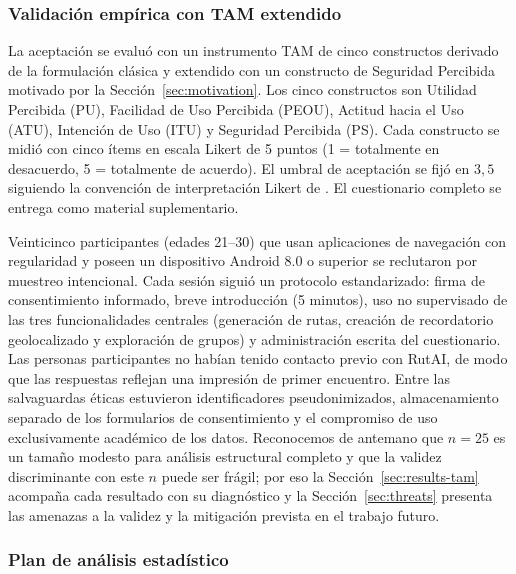 \documentclass[a4paper,fleqn]{cas-sc}
\newcommand{\RUTAI}{RutAI\xspace}
\newcommand{\TAM}{TAM\xspace}
\begin{document}
	\subsubsection{Validaci\'on emp\'irica con TAM extendido}\label{sec:tam-method}
	
	La aceptaci\'on se evalu\'o con un instrumento \TAM de cinco constructos derivado de la formulaci\'on cl\'asica \citep{davis1989tam} y extendido con un constructo de Seguridad Percibida motivado por la Secci\'on~\ref{sec:motivation}. Los cinco constructos son Utilidad Percibida (PU), Facilidad de Uso Percibida (PEOU), Actitud hacia el Uso (ATU), Intenci\'on de Uso (ITU) y Seguridad Percibida (PS). Cada constructo se midi\'o con cinco \'items en escala Likert de 5 puntos (1 = totalmente en desacuerdo, 5 = totalmente de acuerdo). El umbral de aceptaci\'on se fij\'o en $3{,}5$ siguiendo la convenci\'on de interpretaci\'on Likert de \citet{lindner2024likert}. El cuestionario completo se entrega como material suplementario.
	
	Veinticinco participantes (edades 21--30) que usan aplicaciones de navegaci\'on con regularidad y poseen un dispositivo Android 8.0 o superior se reclutaron por muestreo intencional. Cada sesi\'on sigui\'o un protocolo estandarizado: firma de consentimiento informado, breve introducci\'on (5 minutos), uso no supervisado de las tres funcionalidades centrales (generaci\'on de rutas, creaci\'on de recordatorio geolocalizado y exploraci\'on de grupos) y administraci\'on escrita del cuestionario. Las personas participantes no hab\'ian tenido contacto previo con \RUTAI, de modo que las respuestas reflejan una impresi\'on de primer encuentro. Entre las salvaguardas \'eticas estuvieron identificadores pseudonimizados, almacenamiento separado de los formularios de consentimiento y el compromiso de uso exclusivamente acad\'emico de los datos. Reconocemos de antemano que $n=25$ es un tama\~no modesto para an\'alisis estructural completo y que la validez discriminante con este $n$ puede ser fr\'agil; por eso la Secci\'on~\ref{sec:results-tam} acompa\~na cada resultado con su diagn\'ostico y la Secci\'on~\ref{sec:threats} presenta las amenazas a la validez y la mitigaci\'on prevista en el trabajo futuro.
	
	\subsubsection{Plan de an\'alisis estad\'istico}\label{sec:stats}
	
\end{document}
